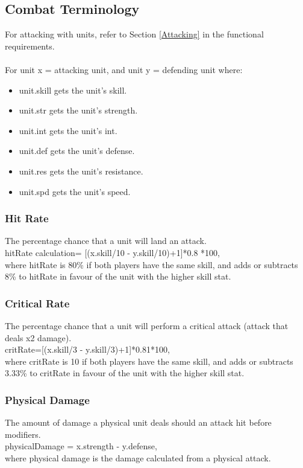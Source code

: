 \documentclass{article}
\begin{document}
\subsection{Combat Terminology} \label{Combat}
For attacking with units, refer to Section \ref{Attacking} in the functional requirements. \\ \\
For unit x = attacking unit, and unit y = defending unit where:
\begin{itemize}
    \item unit.skill gets the unit's skill.
    \item unit.str gets the unit's strength.
    \item unit.int gets the unit's int.
    \item unit.def gets the unit's defense.
    \item unit.res gets the unit's resistance.
    \item unit.spd gets the unit's speed.
\end{itemize}

\subsubsection{Hit Rate}
The percentage chance that a unit will land an attack. \\
hitRate calculation= [(x.skill/10 - y.skill/10)+1]*0.8 *100, \\
where hitRate is 80\% if both players have the same skill, and adds or subtracts 8\% to hitRate in favour of the unit with the higher skill stat.

\subsubsection{Critical Rate}
The percentage chance that a unit will perform a critical attack (attack that deals x2 damage). \\
critRate=[(x.skill/3 - y.skill/3)+1]*0.81*100, \\
where critRate is 10 if both players have the same skill, and adds or subtracts 3.33\% to critRate in favour of the unit with the higher skill stat.

\subsubsection{Physical Damage}
The amount of damage a physical unit deals should an attack hit before modifiers. \\
physicalDamage = x.strength - y.defense, \\
where physical damage is the damage calculated from a physical attack.
\end{document}
